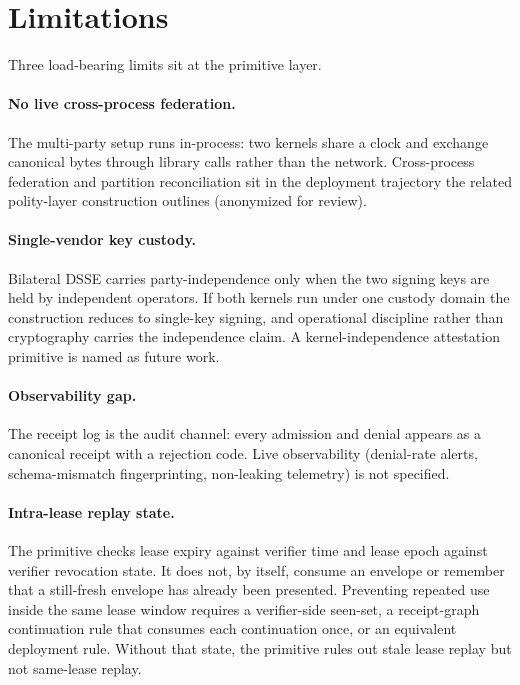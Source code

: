 \section{Limitations}
\label{sec:limits}

Three load-bearing limits sit at the primitive layer.

\paragraph{No live cross-process federation.} The multi-party setup runs in-process: two kernels share a clock and exchange canonical bytes through library calls rather than the network. Cross-process federation and partition reconciliation sit in the deployment trajectory the related polity-layer construction outlines (anonymized for review).

\paragraph{Single-vendor key custody.} Bilateral DSSE carries party-independence only when the two signing keys are held by independent operators. If both kernels run under one custody domain the construction reduces to single-key signing, and operational discipline rather than cryptography carries the independence claim. A kernel-independence attestation primitive is named as future work.

\paragraph{Observability gap.} The receipt log is the audit channel: every admission and denial appears as a canonical receipt with a rejection code. Live observability (denial-rate alerts, schema-mismatch fingerprinting, non-leaking telemetry) is not specified.

\paragraph{Intra-lease replay state.} The primitive checks lease expiry against verifier time and lease epoch against verifier revocation state. It does not, by itself, consume an envelope or remember that a still-fresh envelope has already been presented. Preventing repeated use inside the same lease window requires a verifier-side seen-set, a receipt-graph continuation rule that consumes each continuation once, or an equivalent deployment rule. Without that state, the primitive rules out stale lease replay but not same-lease replay.


